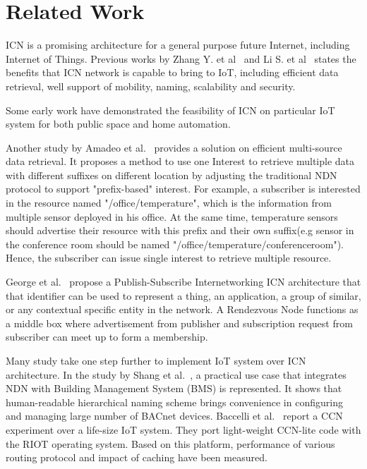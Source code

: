 \section{Related Work}
\label{sec:related}
ICN is a promising architecture for a general purpose future Internet, including Internet of Things. Previous works by Zhang Y. et al~\cite{ietfdraft} and Li S. et al~\cite{compare_study} states the benefits that ICN network is capable to bring to IoT, including efficient data retrieval, well support of mobility, naming, scalability and security.

Some early work have demonstrated the feasibility of ICN on particular IoT system for both public space and home automation.  


Another study by Amadeo et al.~\cite{amadeo2014multi} provides a solution on efficient multi-source data retrieval. It proposes a method to use one Interest to retrieve multiple data with different suffixes on different location by adjusting the traditional NDN protocol to support "prefix-based" interest. For example, a subscriber is interested in the resource named "/office/temperature", which is the information from multiple sensor deployed in his office. At the same time, temperature sensors should advertise their resource with this prefix and their own suffix(e.g sensor in the conference room should be named "/office/temperature/conferenceroom"). Hence, the subscriber can issue single interest to retrieve multiple resource.


George et al.~\cite{polyzos2015building} propose a Publish-Subscribe Internetworking ICN architecture that 
that identifier can be used to represent a thing, an application, a group of similar, or any contextual specific entity in the network. A Rendezvous Node functions as a middle box where advertisement from publisher and subscription request from subscriber can meet up to form a membership. 

Many study take one step further to implement IoT system over ICN architecture. In the study by Shang et al.~\cite{shang2014securing}, a practical use case that integrates NDN with Building Management System (BMS) is represented. It shows that human-readable hierarchical naming scheme brings convenience in configuring and managing large number of BACnet devices. Baccelli et al.~\cite{baccelli2014information} report a CCN experiment over a life-size IoT system. They port light-weight CCN-lite code with the RIOT operating system. Based on this platform, performance of various routing protocol and impact of caching have been measured.  

